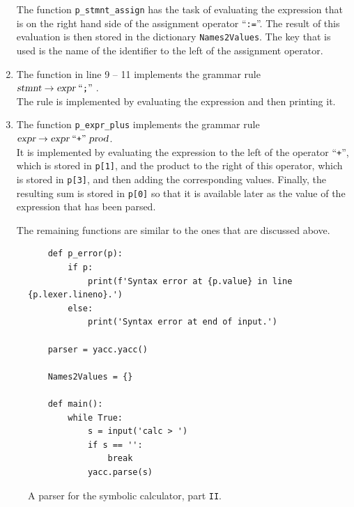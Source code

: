 \begin{enumerate}
      The function \texttt{p\_stmnt\_assign} has the task of evaluating the expression that is on the right
      hand side of the assignment operator ``\texttt{:=}''.  The result of this evaluation is then stored in the
      dictionary \texttt{Names2Values}.  The key that is used is the name of the identifier to the left of the
      assignment operator.
\item The function in line 9 -- 11 implements the grammar rule
      \\[0.2cm]
      \hspace*{1.3cm}
      $\textsl{stmnt} \rightarrow \textsl{expr} \;\mbox{``\texttt{;}''}\;$.
      \\[0.2cm]
      The rule is implemented by evaluating the expression and then printing it.
\item The function \texttt{p\_expr\_plus} implements the grammar rule
      \\[0.2cm]
      \hspace*{1.3cm}
      $\textsl{expr} \rightarrow \textsl{expr} \;\mbox{``\texttt{+}''}\; \textsl{prod}$.
      \\[0.2cm]
      It is implemented by evaluating the expression to the left of the operator ``\texttt{+}'', which is
      stored in \texttt{p[1]}, and the product to the right of this operator, which is stored in \texttt{p[3]},
      and then adding the corresponding values.  Finally, the resulting sum is stored in \texttt{p[0]} so that
      it is available later as the value of the expression that has been parsed.

      The remaining functions are similar to the ones that are discussed above.
\end{enumerate}

\begin{figure}[!ht]
\centering
\begin{verbatim}
    def p_error(p):
        if p:
            print(f'Syntax error at {p.value} in line {p.lexer.lineno}.')
        else:
            print('Syntax error at end of input.')
        
    parser = yacc.yacc()

    Names2Values = {}
    
    def main():
        while True:
            s = input('calc > ')
            if s == '':
                break
            yacc.parse(s)
\end{verbatim}
\vspace*{-0.3cm}
\caption{A parser for the symbolic calculator, part \texttt{II}.}
\label{fig:Symbolic-Calculator.ipynb:yacc2}
\end{figure}
\FloatBarrier

